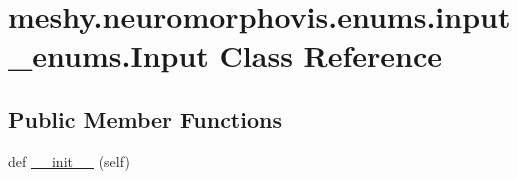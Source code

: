 \hypertarget{classmeshy_1_1neuromorphovis_1_1enums_1_1input__enums_1_1Input}{}\section{meshy.\+neuromorphovis.\+enums.\+input\+\_\+enums.\+Input Class Reference}
\label{classmeshy_1_1neuromorphovis_1_1enums_1_1input__enums_1_1Input}


 


\subsection*{Public Member Functions}
\begin{DoxyCompactItemize}
\item 
def \hyperlink{classmeshy_1_1neuromorphovis_1_1enums_1_1input__enums_1_1Input_a4bf64bb8245805dd02eb302d17a8d15c}{\+\_\+\+\_\+init\+\_\+\+\_\+} (self)\hypertarget{classmeshy_1_1neuromorphovis_1_1enums_1_1input__enums_1_1Input_a4bf64bb8245805dd02eb302d17a8d15c}{}\label{classmeshy_1_1neuromorphovis_1_1enums_1_1input__enums_1_1Input_a4bf64bb8245805dd02eb302d17a8d15c}

\end{DoxyCompactItemize}
